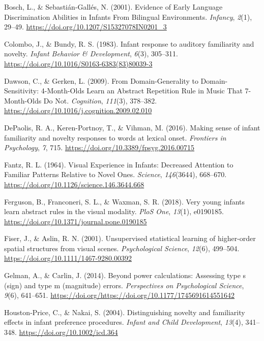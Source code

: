 \documentclass[
  english,
  man,man,floatsintext]{apa6}
\begin{document}
\leavevmode\hypertarget{ref-bosch2001}{}%
Bosch, L., \& Sebastián‐Gallés, N. (2001). Evidence of Early Language Discrimination Abilities in Infants From Bilingual Environments. \emph{Infancy}, \emph{2}(1), 29--49. \url{https://doi.org/10.1207/S15327078IN0201_3}

\leavevmode\hypertarget{ref-colombo1983}{}%
Colombo, J., \& Bundy, R. S. (1983). Infant response to auditory familiarity and novelty. \emph{Infant Behavior \& Development}, \emph{6}(3), 305--311. \url{https://doi.org/10.1016/S0163-6383(83)80039-3}

\leavevmode\hypertarget{ref-dawson2009}{}%
Dawson, C., \& Gerken, L. (2009). From Domain-Generality to Domain-Sensitivity: 4-Month-Olds Learn an Abstract Repetition Rule in Music That 7-Month-Olds Do Not. \emph{Cognition}, \emph{111}(3), 378--382. \url{https://doi.org/10.1016/j.cognition.2009.02.010}

\leavevmode\hypertarget{ref-depaolis2016}{}%
DePaolis, R. A., Keren-Portnoy, T., \& Vihman, M. (2016). Making sense of infant familiarity and novelty responses to words at lexical onset. \emph{Frontiers in Psychology}, \emph{7}, 715. \url{https://doi.org/10.3389/fpsyg.2016.00715}

\leavevmode\hypertarget{ref-fantz1964}{}%
Fantz, R. L. (1964). Visual Experience in Infants: Decreased Attention to Familiar Patterns Relative to Novel Ones. \emph{Science}, \emph{146}(3644), 668--670. \url{https://doi.org/10.1126/science.146.3644.668}

\leavevmode\hypertarget{ref-ferguson2018}{}%
Ferguson, B., Franconeri, S. L., \& Waxman, S. R. (2018). Very young infants learn abstract rules in the visual modality. \emph{PloS One}, \emph{13}(1), e0190185. \url{https://doi.org/10.1371/journal.pone.0190185}

\leavevmode\hypertarget{ref-fiser2001}{}%
Fiser, J., \& Aslin, R. N. (2001). Unsupervised statistical learning of higher-order spatial structures from visual scenes. \emph{Psychological Science}, \emph{12}(6), 499--504. \url{https://doi.org/10.1111/1467-9280.00392}

\leavevmode\hypertarget{ref-gelman2014}{}%
Gelman, A., \& Carlin, J. (2014). Beyond power calculations: Assessing type s (sign) and type m (magnitude) errors. \emph{Perspectives on Psychological Science}, \emph{9}(6), 641--651. \url{https://doi.org/https://doi.org/10.1177/1745691614551642}

\leavevmode\hypertarget{ref-houston-price2004}{}%
Houston‐Price, C., \& Nakai, S. (2004). Distinguishing novelty and familiarity effects in infant preference procedures. \emph{Infant and Child Development}, \emph{13}(4), 341--348. \url{https://doi.org/10.1002/icd.364}
\end{document}
